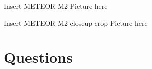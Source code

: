 \documentclass[]{beamer}
\begin{document}
{
\begin{frame}[plain]
\end{frame}}
\begin{frame}
    Insert METEOR M2 Picture here
\end{frame}
\begin{frame}
    Insert METEOR M2 closeup crop Picture here
\end{frame}
\section{Questions}
\frame{\sectionpage}
\end{document}
